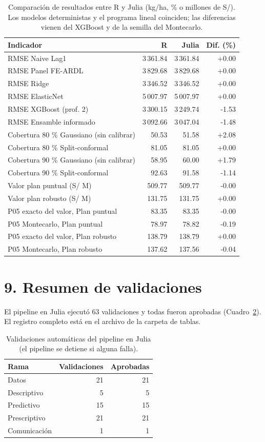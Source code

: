 \documentclass[letterpaper]{report}
\begin{document}
\begin{article}
\begin{table}[htbp]
\centering\footnotesize
\caption{Comparación de resultados entre R y Julia (kg/ha, \% o millones de S/). Los modelos deterministas y el programa lineal coinciden; las diferencias vienen del XGBoost y de la semilla del Montecarlo.}\label{tab:cmp}
\begin{tabular}{lrrr}
\toprule
Indicador & R & Julia & Dif. (\%) \\
\midrule
RMSE Naive Lag1 & 3\,361.84 & 3\,361.84 & +0.00 \\
RMSE Panel FE-ARDL & 3\,829.68 & 3\,829.68 & +0.00 \\
RMSE Ridge & 3\,346.52 & 3\,346.52 & +0.00 \\
RMSE ElasticNet & 5\,007.97 & 5\,007.97 & +0.00 \\
RMSE XGBoost (prof. 2) & 3\,300.15 & 3\,249.74 & -1.53 \\
RMSE Ensamble informado & 3\,092.66 & 3\,047.04 & -1.48 \\
Cobertura 80 \% Gaussiano (sin calibrar) & 50.53 & 51.58 & +2.08 \\
Cobertura 80 \% Split-conformal & 81.05 & 81.05 & +0.00 \\
Cobertura 90 \% Gaussiano (sin calibrar) & 58.95 & 60.00 & +1.79 \\
Cobertura 90 \% Split-conformal & 92.63 & 91.58 & -1.14 \\
Valor plan puntual (S/ M) & 509.77 & 509.77 & -0.00 \\
Valor plan robusto (S/ M) & 131.75 & 131.75 & +0.00 \\
P05 exacto del valor, Plan puntual & 83.35 & 83.35 & -0.00 \\
P05 Montecarlo, Plan puntual & 78.97 & 78.82 & -0.19 \\
P05 exacto del valor, Plan robusto & 138.79 & 138.79 & +0.00 \\
P05 Montecarlo, Plan robusto & 137.62 & 137.56 & -0.04 \\
\bottomrule
\end{tabular}
\end{table}
\section{9. Resumen de validaciones}
El pipeline en Julia ejecutó 63 validaciones y todas fueron aprobadas (Cuadro~\ref{tab:val}). El registro completo está en el archivo  de la carpeta de tablas.

\begin{table}[htbp]
\centering
\small
\caption{Validaciones automáticas del pipeline en Julia (el pipeline se detiene si alguna falla).}\label{tab:val}
\begin{tabular}{lrr}
\toprule
Rama & Validaciones & Aprobadas \\
\midrule
Datos & 21 & 21 \\
Descriptivo & 5 & 5 \\
Predictivo & 15 & 15 \\
Prescriptivo & 21 & 21 \\
Comunicación & 1 & 1 \\
\bottomrule
\end{tabular}
\end{table}

\end{article}
\end{document}
